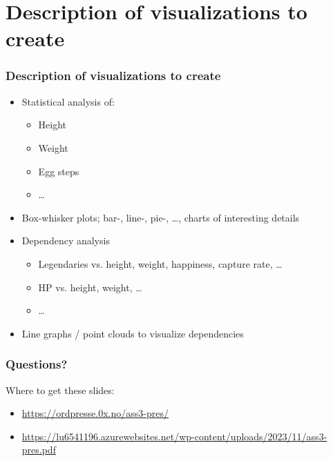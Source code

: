 \documentclass{beamer}
\begin{document}
	\section{Description of visualizations to create}
		\begin{frame}
			\frametitle{Description of visualizations to create}
			\begin{itemize}
				\item Statistical analysis of:
				\begin{itemize}
					\item Height
					\item Weight
					\item Egg steps
					\item \dots
				\end{itemize}
				\item Box-whisker plots; bar-, line-, pie-, \dots, charts of interesting details
				\item Dependency analysis
				\begin{itemize}
					\item Legendaries vs. height, weight, happiness, capture rate, \dots
					\item HP vs. height, weight, \dots
					\item \dots
				\end{itemize}
				\item Line graphs / point clouds to visualize dependencies
			\end{itemize}
		\end{frame}
		\begin{frame}
			\frametitle{Questions?}
			Where to get these slides:\\
			\begin{itemize}
				\item \href{https://ordpresse.0x.no/ass3-pres/}{https://ordpresse.0x.no/ass3-pres/}
				\item \href{https://lu6541196.azurewebsites.net/wp-content/uploads/2023/11/ass3-pres.pdf}{https://lu6541196.azurewebsites.net/wp-content/uploads/2023/11/ass3-pres.pdf}
			\end{itemize}
		\end{frame}
\end{document}

